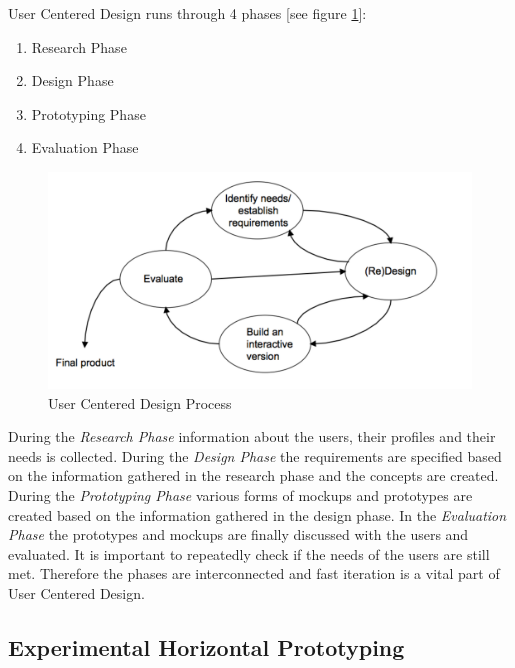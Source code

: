 \documentclass[a4paper,11pt]{article}
\begin{document}
User Centered Design runs through 4 phases [see figure \ref{fig:UCD}]:

\begin{enumerate}
	\item Research Phase
	\item Design Phase
	\item Prototyping Phase
	\item Evaluation Phase
\end{enumerate}

\begin{figure}[htb]
	\centering
		\includegraphics[width=1\textwidth]{images/UCD.pdf}
	\caption{User Centered Design Process}
	\label{fig:UCD}
\end{figure}

During the \emph{Research Phase} information about the users, their profiles and their needs is collected. During the \emph{Design Phase} the requirements are specified based on the information gathered in the research phase and the concepts are created. During the \emph{Prototyping Phase} various forms of mockups and prototypes are created based on the information gathered in the design phase. In the \emph{Evaluation Phase} the prototypes and mockups are finally discussed with the users and evaluated. It is important to repeatedly check if the needs of the users are still met. Therefore the phases are interconnected and fast iteration is a vital part of User Centered Design.

\subsection{Experimental Horizontal Prototyping}
\end{document}
